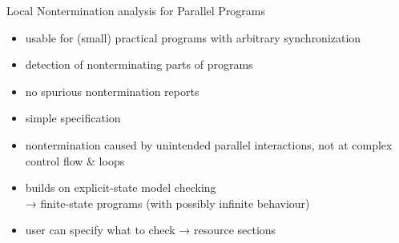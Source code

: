 \documentclass[aspectratio=169, fi]{paradise-slide}
\begin{document}
\begin{frame}[fragile]{Local Nontermination analysis for Parallel Programs}
  \setlength{\leftmargini}{1em}
  \begin{itemize}
    \item usable for (small) practical programs with arbitrary synchronization
    \item detection of nonterminating parts of programs
    \item no spurious nontermination reports
    \item simple specification
    \item nontermination caused by unintended parallel interactions, not at complex control flow \& loops
  \pause
  \bigskip
    \item builds on explicit-state model checking\\
      → finite-state programs (with possibly infinite behaviour)
    \item user can specify what to check → resource sections
  \end{itemize}

%
\end{frame}
\end{document}
